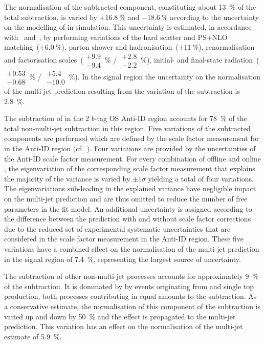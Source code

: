 The normalisation of the subtracted \ttbarTrue component, constituting
about \SI{13}{\percent} of the total subtraction, is varied by
$+\SI{16.8}{\percent}$ and $-\SI{18.6}{\percent}$ according to the
uncertainty on the modelling of \ttbar in simulation. This uncertainty
is estimated, in accordance with~
and~\cite{ATL-PHYS-PUB-2020-023}, by performing variations of the hard
scatter and PS+NLO matching~($\pm\SI{6.0}{\percent}$), parton shower
and hadronisation~($\pm\SI{11}{\percent}$), renormalisation and
factorisation scales~($\substack{+9.9 \\ -9.4}\,\%$ /
$\substack{+2.8 \\ -2.2}\,\%$), initial- and final-state
radiation~($\substack{+0.53 \\ -0.68}\,\%$ /
$\substack{+5.4 \\ -10.0}\,\%$). In the signal region the uncertainty
on the normalisation of the multi-jet prediction resulting from the
variation of the \ttbarTrue subtraction is \SI{2.8}{\percent}.

The subtraction of \ttbarFakes in the 2 $b$-tag OS Anti-ID region
accounts for \SI{78}{\percent} of the total non-multi-jet subtraction
in this region. Five variations of the subtracted components are
performed which are defined by the scale factor measurement for
\ttbarFakes in the Anti-ID region (cf.\
). Four variations are provided by the
uncertainties of the Anti-ID scale factor measurement. For every
combination of offline and online \tauid, the eigenvariation of the
corresponding scale factor measurement that explains the majority of
the variance is varied by $\pm 1 \sigma$ yielding a total of four
variations. The eigenvariations sub-leading in the explained variance
have negligible impact on the multi-jet prediction and are thus
omitted to reduce the number of free parameters in the fit model. An
additional uncertainty is assigned according to the difference between
the \ttbarFakes prediction with and without scale factor corrections
due to the reduced set of experimental systematic uncertainties that
are considered in the \ttbarFakes scale factor measurement in the
Anti-ID region. These five variations have a combined effect on the
normalisation of the multi-jet prediction in the signal region of
\SI{7.4}{\percent}, representing the largest source of uncertainty.

The subtraction of other non-multi-jet processes accounts for
approximately \SI{9}{\percent} of the subtraction. It is dominated by
by events originating from \Vjets and single top production, both
processes contributing in equal amounts to the subtraction. As a
conservative estimate, the normalisation of this component of the
subtraction is varied up and down by \SI{50}{\percent} and the effect
is propagated to the multi-jet prediction. This variation has an
effect on the normalisation of the multi-jet estimate of
\SI{5.9}{\percent}.

